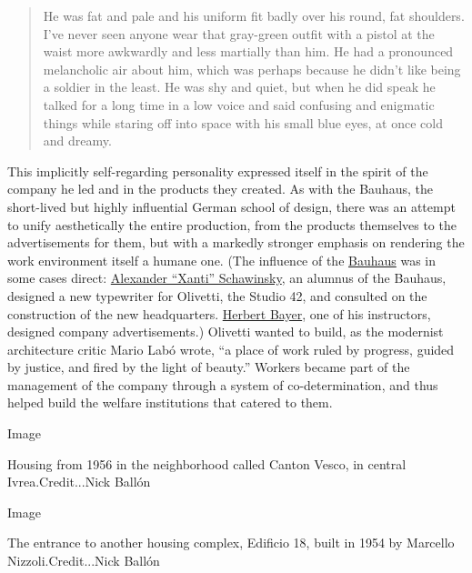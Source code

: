 \begin{quote}
He was fat and pale and his uniform fit badly over his round, fat
shoulders. I've never seen anyone wear that gray-green outfit with a
pistol at the waist more awkwardly and less martially than him. He had a
pronounced melancholic air about him, which was perhaps because he
didn't like being a soldier in the least. He was shy and quiet, but when
he did speak he talked for a long time in a low voice and said confusing
and enigmatic things while staring off into space with his small blue
eyes, at once cold and dreamy.
\end{quote}

This implicitly self-regarding personality expressed itself in the
spirit of the company he led and in the products they created. As with
the Bauhaus, the short-lived but highly influential German school of
design, there was an attempt to unify aesthetically the entire
production, from the products themselves to the advertisements for them,
but with a markedly stronger emphasis on rendering the work environment
itself a humane one. (The influence of the
\href{https://www.nytimes.com/2019/02/04/t-magazine/bauhaus-school-architecture-history.html}{Bauhaus}
was in some cases direct:
\href{https://www.nytimes.com/2015/03/19/arts/artsspecial/archive-of-xanti-schawinsky-bauhaus-artist-is-exhibited-in-zurich.html}{Alexander
``Xanti'' Schawinsky}, an alumnus of the Bauhaus, designed a new
typewriter for Olivetti, the Studio 42, and consulted on the
construction of the new headquarters.
\href{https://www.nytimes.com/1985/10/01/arts/herbert-bayer-85-a-designer-and-artist-of-bauhaus-school.html}{Herbert
Bayer}, one of his instructors, designed company advertisements.)
Olivetti wanted to build, as the modernist architecture critic Mario
Labó wrote, ``a place of work ruled by progress, guided by justice, and
fired by the light of beauty.'' Workers became part of the management of
the company through a system of co-determination, and thus helped build
the welfare institutions that catered to them.

Image

Housing from 1956 in the neighborhood called Canton Vesco, in central
Ivrea.Credit...Nick Ballón

Image

The entrance to another housing complex, Edificio 18, built in 1954 by
Marcello Nizzoli.Credit...Nick Ballón

